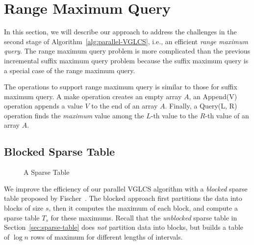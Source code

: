 \section{Range Maximum Query} \label{sec:parallelRMQ}

In this section, we will describe our approach to address the
challenges in the second stage of Algorithm~\ref{alg:parallel-VGLCS},
i.e., an efficient {\em range maximum query}.  The range maximum query
problem is more complicated than the previous incremental suffix
maximum query problem because the suffix maximum query is a special
case of the range maximum query.

The operations to support range maximum query is similar to those for
suffix maximum query.  A {\sc make} operation creates an empty array
$A$, an {\sc Append(V)} operation appends a value $V$ to the end of an
array $A$.  Finally, a {\sc Query(L, R)} operation finds the {\em
  maximum} value among the $L$-th value to the $R$-th value of an
array $A$.


\subsection{Blocked Sparse Table} \label{sec:blocked-sparse-table}

\begin{figure}[!thb]
  \centering {} 
  \caption{A Sparse Table}
  \label{fig:block-interval-decomposition}
\end{figure}

We improve the efficiency of our parallel VGLCS algorithm with a {\em
  blocked} sparse table proposed by
Fischer~\cite{Fischer2006TheoreticalAP}.  The blocked approach first
partitions the data into blocks of size $s$, then it computes the
maximum of each block, and compute a sparse table $T_s$ for these
maximums.  Recall that the {\em unblocked} sparse table in
Section~\ref{sec:sparse-table} does {\em not} partition data into
blocks, but builds a table of $\log n$ rows of maximum for different
lengths of intervals.

